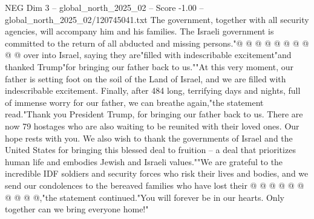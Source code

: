 \begin{textsample}{NEG Dim 3 – global\_north\_2025\_02 – Score -1.00 – global\_north\_2025\_02/120745041.txt}
The government, together with all security agencies, will accompany him and his families.
The Israeli government is committed to the return of all abducted and missing persons."@ @ @ @ @ @ @ @ @ @ over into Israel, saying they are"filled with indescribable excitement"and thanked Trump"for bringing our father back to us.""At this very moment, our father is setting foot on the soil of the Land of Israel, and we are filled with indescribable excitement.
Finally, after 484 long, terrifying days and nights, full of immense worry for our father, we can breathe again,"the statement read."Thank you President Trump, for bringing our father back to us.
There are now 79 hostages who are also waiting to be reunited with their loved ones.
Our hope rests with you.
We also wish to thank the governments of Israel and the United States for bringing this blessed deal to fruition -- a deal that prioritizes human life and embodies Jewish and Israeli values.""We are grateful to the incredible IDF soldiers and security forces who risk their lives and bodies, and we send our condolences to the bereaved families who have lost their @ @ @ @ @ @ @ @ @ @,"the statement continued."You will forever be in our hearts.
Only together can we bring everyone home!"

\end{textsample}
